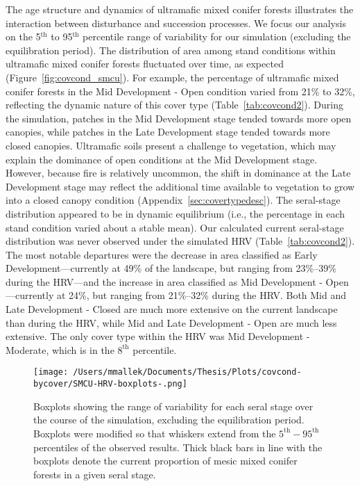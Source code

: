 The age structure and dynamics of ultramafic mixed conifer forests illustrates the interaction between disturbance and succession processes. We focus our analysis on the 5$^{\text{th}}$ to 95$^{\text{th}}$ percentile range of variability for our simulation (excluding the equilibration period). %
%
The distribution of area among stand conditions within ultramafic mixed conifer forests fluctuated over time, as expected (Figure~\ref{fig:covcond_smcu}). For example, the percentage of ultramafic mixed conifer forests in the Mid Development - Open condition varied from 21\% to 32\%, reflecting the dynamic nature of this cover type (Table~\ref{tab:covcond2}). During the simulation, patches in the Mid Development stage tended towards more open canopies, while patches in the Late Development stage tended towards more closed canopies. Ultramafic soils present a challenge to vegetation, which may explain the dominance of open conditions at the Mid Development stage. However, because fire is relatively uncommon, the shift in dominance at the Late Development stage may reflect the additional time available to vegetation to grow into a closed canopy condition (Appendix~\ref{sec:covertypedesc}). %
%
The seral-stage distribution appeared to be in dynamic equilibrium (i.e., the percentage in each stand condition varied about a stable mean). Our calculated current seral-stage distribution was never observed under the simulated HRV (Table~\ref{tab:covcond2}). The most notable departures were the decrease in area classified as Early Development---currently at 49\% of the landscape, but ranging from 23\%--39\% during the HRV---and the increase in area classified as Mid Development - Open---currently at 24\%, but ranging from 21\%--32\% during the HRV. Both Mid and Late Development - Closed are much more extensive on the current landscape than during the HRV, while Mid and Late Development - Open are much less extensive. The only cover type within the HRV was Mid Development - Moderate, which is in the $8^{\text{th}}$ percentile.

\begin{figure}[!htbp]
  \centering
    \texttt{[image: /Users/mmallek/Documents/Thesis/Plots/covcond-bycover/SMCU-HRV-boxplots-.png]}
  \caption{Boxplots showing the range of variability for each seral stage over the course of the simulation, excluding the equilibration period. Boxplots were modified so that whiskers extend from the $5^{\text{th}} - 95^{\text{th}}$ percentiles of the observed results. Thick black bars in line with the boxplots denote the current proportion of mesic mixed conifer forests in a given seral stage.} 
  \label{fig:covcond_smcu_boxplots}
\end{figure}

